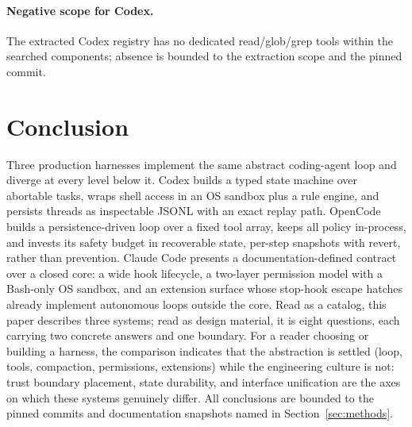 \documentclass{article}
\newcommand{\codex}[0]{Codex}
\newcommand{\occ}[0]{OpenCode}
\newcommand{\ccc}[0]{Claude Code}
\begin{document}
\paragraph{Negative scope for Codex.} The extracted \codex{} registry has
no dedicated read/glob/grep tools within the searched components; absence
is bounded to the extraction scope and the pinned commit.

\section{Conclusion}

Three production harnesses implement the same abstract coding-agent loop
and diverge at every level below it. \codex{} builds a typed state machine
over abortable tasks, wraps shell access in an OS sandbox plus a rule
engine, and persists threads as inspectable JSONL with an exact replay
path. \occ{} builds a persistence-driven loop over a fixed tool array,
keeps all policy in-process, and invests its safety budget in recoverable
state, per-step snapshots with revert, rather than prevention. \ccc{}
presents a documentation-defined contract over a closed core: a wide hook
lifecycle, a two-layer permission model with a Bash-only OS sandbox, and an
extension surface whose stop-hook escape hatches already implement
autonomous loops outside the core. Read as a catalog, this paper
describes three systems; read as design material, it is eight questions,
each carrying two concrete answers and one boundary. For a reader
choosing or building a harness, the comparison indicates that the
abstraction is settled (loop, tools, compaction, permissions,
extensions) while the engineering culture is not: trust boundary
placement, state durability, and interface unification are the axes on
which these systems genuinely differ. All conclusions are
bounded to the pinned commits and documentation snapshots named in
Section~\ref{sec:methods}.



\end{document}
